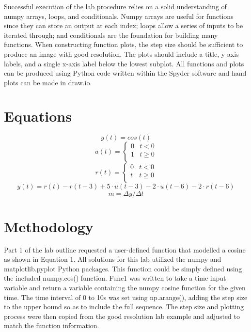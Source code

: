 \documentclass[12pt]{report}
\begin{document}
Successful execution of the lab procedure relies on a solid understanding of numpy arrays, loops, and conditionals. Numpy arrays are useful for functions since they can store an output at each index; loops allow a series of inputs to be iterated through; and conditionals are the foundation for building many functions. When constructing function plots, the step size should be sufficient to produce an image with good resolution. The plots should include a title, y-axis labels, and a single x-axis label below the lowest subplot. All functions and plots can be produced using Python code written within the Spyder software and hand plots can be made in draw.io. \\

\section{Equations}

\begin{equation}
    y(t)= cos(t)
\end{equation}
\begin{equation}
    u(t)=
    \begin{cases}
    0 & t < 0\\
    1 & t\ge 0\\
    \end{cases}
\end{equation}
\begin{equation}
    r(t)=
    \begin{cases}
    0 & t < 0\\
    t & t\ge 0\\
    \end{cases}
\end{equation}
\begin{equation}
    y(t)= r(t) - r(t - 3) + 5 \cdot u(t - 3) - 2 \cdot u(t - 6) - 2 \cdot r(t - 6)
\end{equation}
\begin{equation}
    m = \Delta y / \Delta t
\end{equation}

\section{Methodology}

Part 1 of the lab outline requested a user-defined function that modelled a cosine as shown in Equation 1. All solutions for this lab utilized the numpy and matplotlib.pyplot Python packages. This function could be simply defined using the included numpy.cos() function. Func1 was written to take a time input variable and return a variable containing the numpy cosine function for the given time. The time interval of 0 to 10s was set using np.arange(), adding the step size to the upper bound so as to include the full sequence. The step size and plotting process were then copied from the good resolution lab example and adjusted to match the function information. \\
\end{document}
